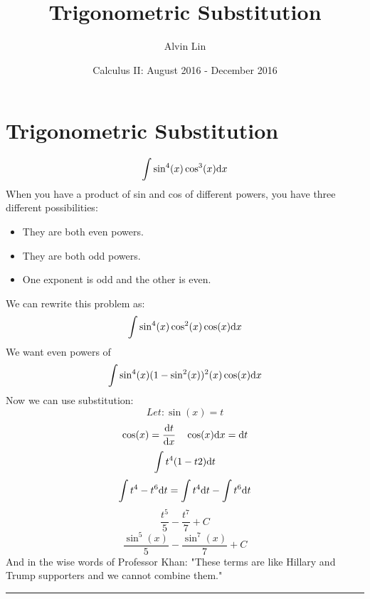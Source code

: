 \documentclass[letterpaper, 12pt]{math}
\title{Trigonometric Substitution}
\author{Alvin Lin}
\date{Calculus II: August 2016 - December 2016}
\begin{document}
\maketitle

\section*{Trigonometric Substitution}
\[ \int{\sin^{4}(x)\cos^{3}(x)\mathrm{d}{x}} \]
When you have a product of sin and cos of different powers,
you have three different possibilities:
\begin{itemize}
  \item They are both even powers.
  \item They are both odd powers.
  \item One exponent is odd and the other is even.
\end{itemize}
We can rewrite this problem as:
\[ \int{\sin^{4}(x)\cos^{2}(x)\cos(x)\mathrm{d}{x}} \]
We want even powers of
\[ \int{\sin^{4}(x)(1-\sin^{2}(x))^{2}(x)\cos(x)\mathrm{d}{x}} \]
Now we can use substitution:
\[ Let: \sin(x) = t \]
\[ \cos(x) = \frac{\mathrm{d}{t}}{\mathrm{d}{x}} \quad \cos(x)\mathrm{d}{x} = \mathrm{d}{t} \]
\[ \int{t^{4}(1-t{2})\mathrm{d}{t}} \]
\[ \int{t^{4}-t^{6}\mathrm{d}{t}} = \int{t^{4}\mathrm{d}{t}}-\int{t^{6}\mathrm{d}{t}} \]
\[ \frac{t^{5}}{5}-\frac{t^{7}}{7}+C \]
\[ \frac{\sin^{5}(x)}{5}-\frac{\sin^{7}(x)}{7}+C \]
And in the wise words of Professor Khan: "These terms are like Hillary and
Trump supporters and we cannot combine them."

\noindent\rule{13.7cm}{0.4pt}
\end{document}
